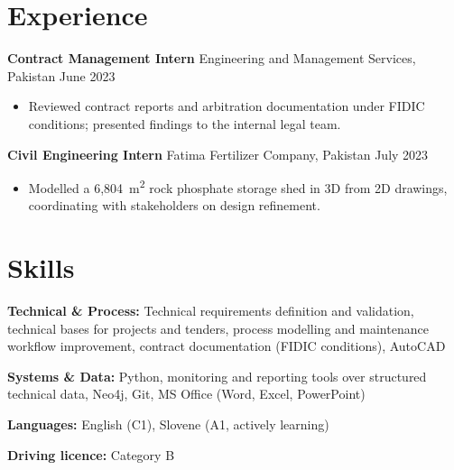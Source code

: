 \documentclass[a4paper,10.5pt]{article}
\newcommand{\datefill}{\dotfill}
\newcommand{\entry}[3]{\vspace{2.5pt}\noindent\textbf{#1} \textbar{} #2 \datefill{} #3\par\vspace{0.5pt}}
\newcommand{\skillrow}[2]{\noindent\textbf{#1:} #2\par\vspace{1pt}}
\begin{document}
\section{Experience}
\entry{Contract Management Intern}{Engineering and Management Services, Pakistan}{June 2023}
\begin{itemize}
  \item Reviewed contract reports and arbitration documentation under FIDIC
        conditions; presented findings to the internal legal team.
\end{itemize}

\entry{Civil Engineering Intern}{Fatima Fertilizer Company, Pakistan}{July 2023}
\begin{itemize}
  \item Modelled a 6,804~m\textsuperscript{2} rock phosphate storage shed in 3D from
        2D drawings, coordinating with stakeholders on design refinement.
\end{itemize}

\section{Skills}

\skillrow{Technical \& Process}{Technical requirements definition and validation, technical bases for projects and tenders, process modelling and maintenance workflow improvement, contract documentation (FIDIC conditions), AutoCAD}
\skillrow{Systems \& Data}{Python, monitoring and reporting tools over structured technical data, Neo4j, Git, MS Office (Word, Excel, PowerPoint)}

\skillrow{Languages}{English (C1), Slovene (A1, actively learning)}
\skillrow{Driving licence}{Category B}
\end{document}
